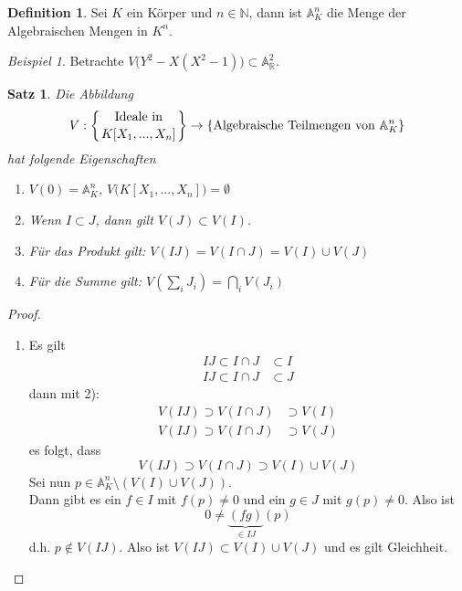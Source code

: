 \documentclass[10pt,a4paper]{article}
\newcommand{\N}{\ensuremath{\mathbb{N}}}
\newcommand{\R}{\ensuremath{\mathbb{R}}}
\newcommand{\A}{\ensuremath{\mathbb{A}}}
\theoremstyle{plain}
\newtheorem{satz}[theorem]{Satz}
\theoremstyle{definition}
\newtheorem{definition}[theorem]{Definition}
\theoremstyle{remark}
\newtheorem{exm}[theorem]{Beispiel}
\begin{document}
	
	\begin{definition}
		Sei $K$ ein Körper und $n\in\N$, dann ist $\A_K^n$ die Menge der Algebraischen Mengen in $K^n$.
	\end{definition}
	
	\begin{exm}
		Betrachte $V\big(Y^2-X(X^2-1)\big)\subset \A^2_\R$.
	\end{exm}

	\begin{satz}
		Die Abbildung
		\[V:\left\{\text{Ideale in}\atop{K[X_1,...,X_n]}\right\}\to\left\{\text{Algebraische Teilmengen von $\A^n_K$}\right\}\]
		hat folgende Eigenschaften
		\begin{enumerate}
			\item $V(0)=\A_K^n$, $V\big(K[X_1,...,X_n]\big)=\emptyset$
			\item Wenn $I\subset J$, dann gilt $V(J)\subset V(I)$.
			\item Für das Produkt gilt: $V(IJ)=V(I\cap J)=V(I)\cup V(J)$
			\item Für die Summe gilt: $V(\sum_i J_i)=\bigcap_i V(J_i)$
		\end{enumerate}
	\end{satz}
	\begin{proof}
		\begin{enumerate}
			Wir zeigen nur
			\addtocounter{enumi}{2}
			\item Es gilt
			\begin{align*}
			IJ\subset I\cap J&\subset I\\
			IJ\subset I\cap J&\subset J
			\end{align*}
			dann mit 2):
			\begin{align*}
			V(IJ)\supset V(I\cap J)&\supset V(I)\\
			V(IJ)\supset V(I\cap J)&\supset V(J)
			\end{align*}
			es folgt, dass
			\[V(IJ)\supset V(I\cap J)\supset V(I)\cup V(J)\]
			Sei nun $p\in \A_K^n\setminus(V(I)\cup V(J))$.\\
			Dann gibt es ein $f\in I$ mit $f(p)\neq 0$ und ein $g\in J$ mit $g(p)\neq 0$. Also ist 
			\[0\neq\underbrace{(fg)}_{\in IJ}(p)\]
			d.h. $p\notin V(IJ)$. Also ist $V(IJ)\subset V(I)\cup V(J)$ und es gilt Gleichheit.
		\end{enumerate}
	\end{proof}
\end{document}
